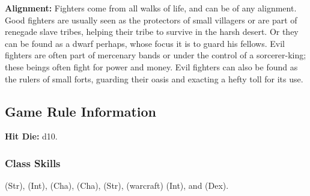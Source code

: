 \textbf{Alignment:} Fighters come from all walks of life, and can be of any alignment. Good fighters are usually seen as the protectors of small villagers or are part of renegade slave tribes, helping their tribe to survive in the harsh desert. Or they can be found as a dwarf perhaps, whose focus it is to guard his fellows. Evil fighters are often part of mercenary bands or under the control of a sorcerer-king; these beings often fight for power and money. Evil fighters can also be found as the rulers of small forts, guarding their oasis and exacting a hefty toll for its use.


\subsection{Game Rule Information}
\textbf{Hit Die:} d10.

\subsubsection{Class Skills}
 (Str),  (Int),  (Cha),  (Cha),  (Str),  (warcraft) (Int), and  (Dex).

